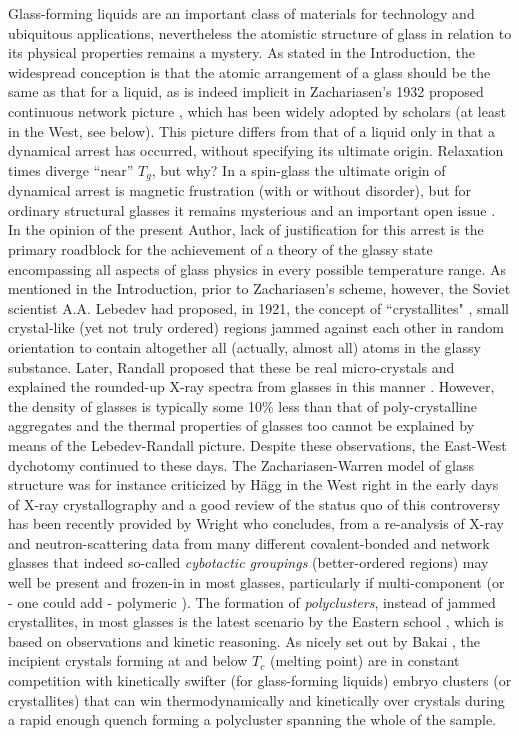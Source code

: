 \documentclass[10pt]{article}
\begin{document}
Glass-forming liquids are an important class of materials for technology and 
ubiquitous applications, nevertheless the atomistic structure of glass in relation 
to its physical properties remains a mystery. As stated in the Introduction,
the widespread conception is that the atomic arrangement of a glass should be 
the same as that for a liquid, as is indeed implicit in Zachariasen's 1932 proposed 
continuous network picture \cite{Zac1932,War1934}, which has been widely 
adopted by scholars (at least in the West, see below). This picture differs from 
that of a liquid only in that a dynamical arrest has occurred, without specifying 
its ultimate origin. Relaxation times diverge ``near'' $T_g$, but why? In a 
spin-glass the ultimate origin of dynamical arrest is magnetic frustration (with 
or without disorder), but for ordinary structural glasses it remains mysterious 
and an important open issue \cite{Ber2011,Ang1988,Lub2007,Sim2009}. In the
opinion of the present Author, lack of justification for this arrest is the primary 
roadblock for the achievement of a theory of the glassy state encompassing all
aspects of glass physics in every possible temperature range. As mentioned in 
the Introduction, prior to Zachariasen's scheme, however, the Soviet scientist 
A.A. Lebedev had proposed, in 1921, the concept of ``crystallites" \cite{Leb1921}, 
small crystal-like (yet not truly ordered) regions jammed against each other in 
random orientation to contain altogether all (actually, almost all) atoms in the 
glassy substance. Later, Randall proposed that these be real micro-crystals and 
explained the rounded-up X-ray spectra from glasses in this manner \cite{Ran1930}. 
However, the density of glasses is typically some 10\% less than that of 
poly-crystalline aggregates and the thermal properties of glasses too cannot be 
explained by means of the Lebedev-Randall picture. Despite these observations, 
the East-West dychotomy continued to these days. The Zachariasen-Warren model 
of glass structure was for instance criticized by H\"agg \cite{Hag1935} in the West 
right in the early days of X-ray crystallography and a good review of the status 
quo of this controversy has been recently provided by Wright \cite{Wri2014} 
who concludes, from a re-analysis of X-ray and neutron-scattering data from 
many different covalent-bonded and network glasses that indeed so-called
{\em cybotactic groupings} (better-ordered regions) may well be present and 
frozen-in in most glasses, particularly if multi-component (or - one could add -
polymeric \cite{Koi2016}). 
The formation of {\em polyclusters}, instead of jammed crystallites, in most 
glasses is the latest scenario by the Eastern school \cite{Bak1994,Bak2013}, which
is based on observations and kinetic reasoning. As nicely set out by Bakai 
\cite{Bak1994}, the incipient crystals forming at and below $T_c$ (melting point) 
are in constant competition with kinetically swifter (for glass-forming liquids) 
embryo clusters (or crystallites) that can win thermodynamically and kinetically 
over crystals during a rapid enough quench forming a polycluster spanning the 
whole of the sample.  
\end{document}
